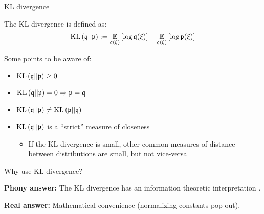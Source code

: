 \begin{frame}{KL divergence}

The KL divergence is defined as:
%
\begin{align*}
%
\kl{\q}{\p} :=
\expect{\q(\xi)}{\log \q(\xi)} - \expect{\q(\xi)}{\log \p(\xi)}
%
\end{align*}
%

Some points to be aware of:
\begin{itemize}
    \item $\mathrm{KL}\left(\mathfrak{q} || \mathfrak{p} \right) \ge 0$
    \item $\mathrm{KL}\left(\mathfrak{q} || \mathfrak{p} \right) = 0 \Rightarrow \mathfrak{p} = \mathfrak{q}$
    \item $\mathrm{KL}\left(\mathfrak{q} || \mathfrak{p} \right) \ne \mathrm{KL}\left(\mathfrak{p} || \mathfrak{q} \right)$
    \item $\mathrm{KL}\left(\mathfrak{q} || \mathfrak{p} \right)$ is a ``strict'' measure of closeness
    \begin{itemize}
         \item If the KL divergence is small, other common
         measures of distance between distributions are small, but
         not vice-versa \citep{gibbs2002choosing}
     \end{itemize}
\end{itemize}

Why use KL divergence?

\textbf{Phony answer:}
The KL divergence has an information theoretic
interpretation \citep{kullback1951information}.

\textbf{Real answer:}
Mathematical convenience (normalizing constants pop out).

\end{frame}
